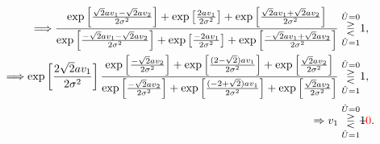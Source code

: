 \documentclass{assignment}
\begin{document}
\begin{sol}
\begin{align}
        \Longrightarrow\frac{\exp\left[\frac{\sqrt{2}av_1-\sqrt{2}av_2}{2\sigma^2}\right]+\exp\left[\frac{2av_1}{2\sigma^2}\right]+\exp\left[\frac{\sqrt{2}av_1+\sqrt{2}av_2}{2\sigma^2}\right]}{\exp\left[\frac{-\sqrt{2}av_1-\sqrt{2}av_2}{2\sigma^2}\right]+\exp\left[\frac{-2av_1}{2\sigma^2}\right]+\exp\left[\frac{-\sqrt{2}av_1+\sqrt{2}av_2}{2\sigma^2}\right]}\overset{\hat{U}=0}{\underset{\hat{U}=1}{\gtreqless}}&1,\\
        \Longrightarrow\exp\left[\frac{2\sqrt{2}av_1}{2\sigma^2}\right]\frac{\exp\left[\frac{-\sqrt{2}av_2}{2\sigma^2}\right]+\exp\left[\frac{(2-\sqrt{2})av_1}{2\sigma^2}\right]+\exp\left[\frac{\sqrt{2}av_2}{2\sigma^2}\right]}{\exp\left[\frac{-\sqrt{2}av_2}{2\sigma^2}\right]+\exp\left[\frac{(-2+\sqrt{2})av_1}{2\sigma^2}\right]+\exp\left[\frac{\sqrt{2}av_2}{2\sigma^2}\right]}\overset{\hat{U}=0}{\underset{\hat{U}=1}{\gtreqless}}&1,\\
        \Rightarrow v_1\overset{\hat{U}=0}{\underset{\hat{U}=1}{\gtreqless}}&\text{\sout{$1$}}{\color{red}0}.
    \end{align}
\end{sol}
\end{document}
